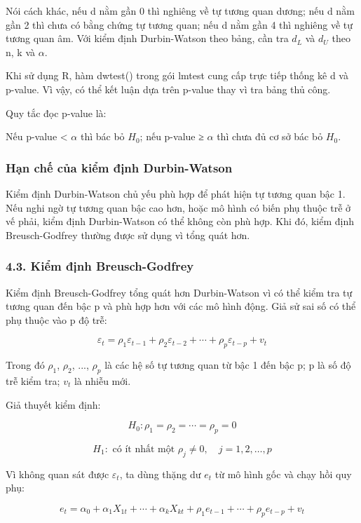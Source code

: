 Nói cách khác, nếu d nằm gần 0 thì nghiêng về tự tương quan dương; nếu d
nằm gần 2 thì chưa có bằng chứng tự tương quan; nếu d nằm gần 4 thì
nghiêng về tự tương quan âm. Với kiểm định Durbin-Watson theo bảng, cần
tra \(d_L\) và \(d_U\) theo n, k và \(\alpha\).

Khi sử dụng R, hàm dwtest() trong gói lmtest cung cấp trực tiếp thống kê
d và p-value. Vì vậy, có thể kết luận dựa trên p-value thay vì tra bảng
thủ công.

Quy tắc đọc p-value là:

Nếu p-value < \(\alpha\) thì bác bỏ \(H_0\); nếu p-value ≥ \(\alpha\) thì chưa đủ cơ
sở bác bỏ \(H_0\).

\subsubsection{Hạn chế của kiểm định
Durbin-Watson}\label{hux1ea1n-chux1ebf-cux1ee7a-kiux1ec3m-ux111ux1ecbnh-durbin-watson}

Kiểm định Durbin-Watson chủ yếu phù hợp để phát hiện tự tương quan bậc
1. Nếu nghi ngờ tự tương quan bậc cao hơn, hoặc mô hình có biến phụ
thuộc trễ ở vế phải, kiểm định Durbin-Watson có thể không còn phù hợp.
Khi đó, kiểm định Breusch-Godfrey thường được sử dụng vì tổng quát hơn.

\subsubsection{4.3. Kiểm định
Breusch-Godfrey}\label{kiux1ec3m-ux111ux1ecbnh-breusch-godfrey}

Kiểm định Breusch-Godfrey tổng quát hơn Durbin-Watson vì có thể kiểm tra
tự tương quan đến bậc p và phù hợp hơn với các mô hình động. Giả sử sai
số có thể phụ thuộc vào p độ trễ:

\[
\varepsilon_t=\rho_1\varepsilon_{t-1}+\rho_2\varepsilon_{t-2}+\cdots+\rho_p\varepsilon_{t-p}+v_t
\]

Trong đó \(\rho_1\), \(\rho_2\), ..., \(\rho_p\) là các hệ số tự tương quan từ bậc 1 đến bậc p;
p là số độ trễ kiểm tra; \(v_t\) là nhiễu mới.

Giả thuyết kiểm định:

\[
H_0:\rho_1=\rho_2=\cdots=\rho_p=0
\]

\[
H_1:\text{ có ít nhất một }\rho_j\neq 0,\quad j=1,2,\ldots,p
\]

Vì không quan sát được \(\varepsilon_t\), ta dùng thặng dư \(e_t\) từ mô hình gốc và chạy
hồi quy phụ:

\[
e_t=\alpha_0+\alpha_1X_{1t}+\cdots+\alpha_kX_{kt}+\rho_1e_{t-1}+\cdots+\rho_pe_{t-p}+v_t
\]

